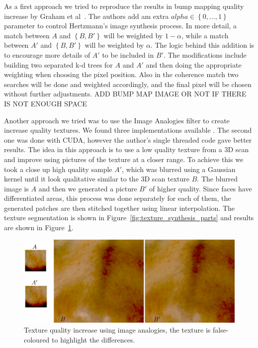 \documentclass[11pt]{article}
\begin{document}
As a first approach we tried to reproduce the results in bump mapping quality increase by Graham et al~\cite{Graham2013}.
The authors add am extra $alpha \in \left\lbrace 0, \ldots, 1 \right\rbrace$ parameter to control Hertzmann's image synthesis process.
In more detail, a match between $A$ and $\left\lbrace B,B' \right\rbrace$ will be weighted by $1 - \alpha$, while a match between $A'$ and $\left\lbrace B,B' \right\rbrace$ will be weighted by $\alpha$.
The logic behind this addition is to encourage more details of $A'$ to be included in $B'$.
The modifications include building two separated k-d trees for $A$ and $A'$ and then doing the appropriate weighting when choosing the pixel position.
Also in the coherence match two searches will be done and weighted accordingly, and the final pixel will be chosen without further adjustments.
ADD BUMP MAP IMAGE OR NOT IF THERE IS NOT ENOUGH SPACE

Another approach we tried was to use the Image Analogies filter to create increase quality textures.
We found three implementations available \cite{ImAnSingleThreadWeb, ImAnCudaWeb, ImAnHertzmannWeb}.
The second one was done with CUDA, however the author's single threaded code gave better results.
The idea in this approach is to use a low quality texture from a 3D scan and improve using pictures of the texture at a closer range.
To achieve this we took a close up high quality sample $A'$, which was blurred using a Gaussian kernel until it look qualitative similar to the 3D scan texture $B$.
The blurred image is $A$ and then we generated a picture $B'$ of higher quality.
Since faces have differentiated areas, this process was done separately for each of them, the generated patches are then stitched together using linear interpolation.
The texture segmentation is shown in Figure~\ref{fig:texture_synthesis_parts} and results are shown in Figure~\ref{fig:texture_synthesis}.

\begin{figure}[htbp!]
\centering
\includegraphics[width=\textwidth]{img/texture_synthesis}
	\caption{ Texture quality increase using image analogies, the texture is false-coloured to highlight the differences.}
	\label{fig:texture_synthesis}
\end{figure}
\end{document}
